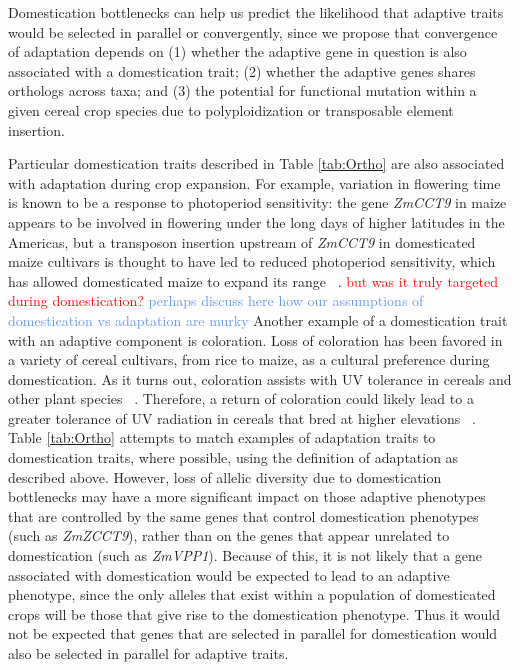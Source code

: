\documentclass[12pt]{article}
\newcommand{\mbh}[1]{\textcolor{red}{\normalsize  #1}}
\newcommand{\mw}[1]{\textcolor{cornflowerblue}{\normalsize #1}}
\begin{document}
Domestication bottlenecks can help us predict the likelihood that adaptive traits would be selected in parallel or convergently, since we propose that convergence of adaptation depends on (1) whether the adaptive gene in question is also associated with a domestication trait; (2) whether the adaptive genes shares orthologs across taxa; and (3) the potential for functional mutation within a given cereal crop species due to polyploidization or transposable element insertion. 

Particular domestication traits described in Table \ref{tab:Ortho} are also associated with adaptation during crop expansion.
For example, variation in flowering time is known to be a response to photoperiod sensitivity: the gene \textit{ZmCCT9} in maize appears to be involved in flowering under the long days of higher latitudes in the Americas, but a transposon insertion upstream of \textit{ZmCCT9} in domesticated maize cultivars is thought to have led to reduced photoperiod sensitivity, which has allowed domesticated maize to expand its range ~\citep{Huang2017}.
\mbh{but was it truly targeted during domestication?} \mw{perhaps discuss here how our assumptions of domestication vs adaptation are murky}
Another example of a domestication trait with an adaptive component is coloration.
Loss of coloration has been favored in a variety of cereal cultivars, from rice to maize, as a cultural preference during domestication.
As it turns out, coloration assists with UV tolerance in cereals and other plant species ~\citep{pmid8058838, Gould2004}.
Therefore, a return of coloration could likely lead to a greater tolerance of UV radiation in cereals that bred at higher elevations ~\citep{Pyhjrvi2013}.
Table \ref{tab:Ortho} attempts to match examples of adaptation traits to domestication traits, where possible, using the definition of adaptation as described above. 
However, loss of allelic diversity due to domestication bottlenecks may have a more significant impact on those adaptive phenotypes that are controlled by the same genes that control domestication phenotypes (such as \textit{ZmZCCT9}), rather than on the genes that appear unrelated to domestication (such as \textit{ZmVPP1}).
Because of this, it is not likely that a gene associated with domestication would be expected to lead to an adaptive phenotype, since the only alleles that exist within a population of domesticated crops will be those that give rise to the domestication phenotype. Thus it would not be expected that genes that are selected in parallel for domestication would also be selected in parallel for adaptive traits. 
\end{document}
